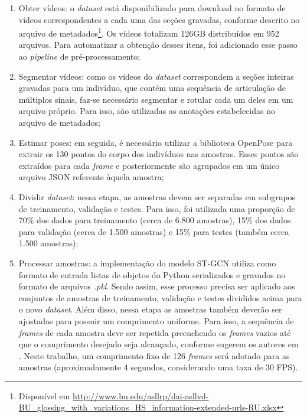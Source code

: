 \begin{enumerate}
    \item Obter vídeos: o \textit{dataset} está disponibilizado para download no formato de vídeos correspondentes a cada uma das seções gravadas, conforme descrito no arquivo de metadados\footnote{
        Disponível em \url{http://www.bu.edu/asllrp/dai-asllvd-BU_glossing_with_variations_HS_information-extended-urls-RU.xlsx}
    }. Os vídeos totalizam 126GB distribuídos em 952 arquivos. Para automatizar a obtenção desses itens, foi adicionado esse passo ao  \textit{pipeline} de pré-processamento;
    \item Segmentar vídeos: como os vídeos do \textit{dataset} correspondem a seções inteiras gravadas para um indivíduo, que contém uma sequência de articulação de múltiplos sinais, faz-se necessário segmentar e rotular cada um deles em um arquivo próprio. Para isso, são utilizadas as anotações estabelecidas no arquivo de metadados;
    \item Estimar poses: em seguida, é necessário utilizar a biblioteca OpenPose para extrair os 130 pontos do corpo dos indivíduos nas amostras. Esses pontos são extraídos para cada \textit{frame} e posteriormente são agrupados em um único arquivo JSON referente àquela amostra;
    \item Dividir \textit{dataset}: nessa etapa, as amostras devem ser separadas em subgrupos de treinamento, validação e testes. Para isso, foi utilizada uma proporção de 70\% dos dados para treinamento (cerca de 6.800 amostras), 15\% dos dados para validação (cerca de 1.500 amostras) e 15\% para testes (também cerca 1.500 amostras);
    \item Processar amostras: a implementação do modelo ST-GCN utiliza como formato de entrada listas de objetos do Python serializados e gravados no formato de arquivos \textit{.pkl}. Sendo assim, esse processo precisa ser aplicado aos conjuntos de amostras de treinamento, validação e testes divididos acima para o novo \textit{dataset}. Além disso, nessa etapa as amostras também deverão ser ajustadas para possuir um comprimento uniforme. Para isso, a sequência de \textit{frames} de cada amostra deve ser repetida preenchendo os \textit{frames} vazios até que o comprimento desejado seja alcançado, conforme sugerem os autores em \cite{st-gcn-2018}. Neste trabalho, um comprimento fixo de 126 \textit{frames} será adotado para as amostras (aproximadamente 4 segundos, considerando uma taxa de 30 FPS).
\end{enumerate}

